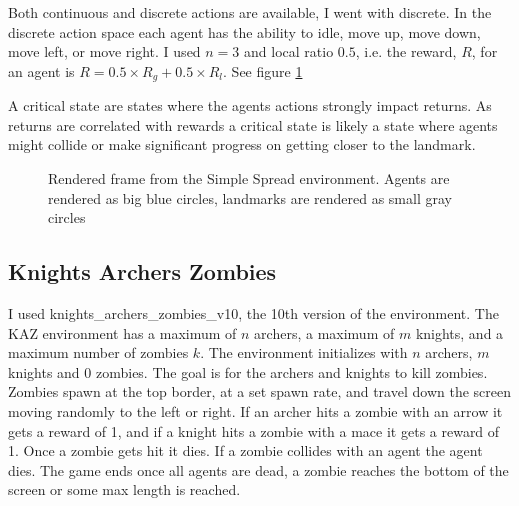 \documentclass[UKenglish]{uiomasterthesis}
\begin{document}
Both continuous and discrete actions are available, I went with discrete. In the discrete action space each agent has the ability to idle, move up, move down, move left, or move right. I used $n=3$ and local ratio $0.5$, i.e. the reward, $R$, for an agent is $R = 0.5\times R_g + 0.5\times R_l$. See figure \ref{fig:simple_spread_env}

A critical state are states where the agents actions strongly impact returns. As returns are correlated with rewards a critical state is likely a state where agents might collide or make significant progress on getting closer to the landmark.

\begin{figure}[H]
    \centering
    \caption{Rendered frame from the Simple Spread environment. Agents are rendered as big blue circles, landmarks are rendered as small gray circles}
    \label{fig:simple_spread_env}
\end{figure}

\subsection{Knights Archers Zombies}
\label{sec:kaz_env}
I used knights\_archers\_zombies\_v10, the 10th version of the environment. The KAZ environment has a maximum of $n$ archers, a maximum of $m$ knights, and a maximum number of zombies $k$. The environment initializes with $n$ archers, $m$ knights and 0 zombies. The goal is for the archers and knights to kill zombies. Zombies spawn at the top border, at a set spawn rate, and travel down the screen moving randomly to the left or right. If an archer hits a zombie with an arrow it gets a reward of 1, and if a knight hits a zombie with a mace it gets a reward of 1. Once a zombie gets hit it dies. If a zombie collides with an agent the agent dies. The game ends once all agents are dead, a zombie reaches the bottom of the screen or some max length is reached.
\end{document}
